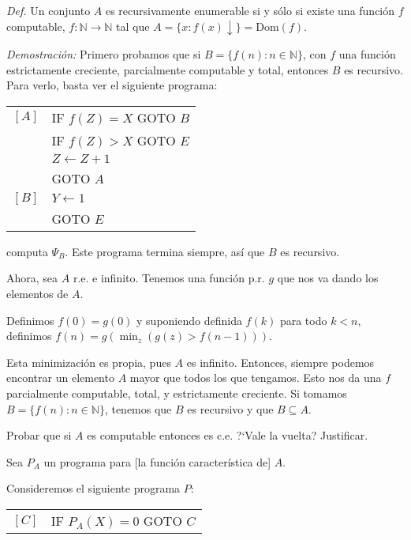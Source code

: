 \begin{questions}
\begin{solution}
 
 {\it Def. } Un conjunto $A$ es recursivamente enumerable si y s\'olo si existe una funci\'on $f$ computable, $f: \mathbb{N} \rightarrow \mathbb{N}$ tal que $A = \{x : f(x)\downarrow \} = \text{Dom}(f)$.
 
 {\it Demostraci\'on: } Primero probamos que si $B = \{ f(n) : n \in \mathbb{N} \}$, con $f$ una funci\'on estrictamente creciente, parcialmente computable y total, entonces $B$ es recursivo. Para verlo, basta ver el siguiente programa: 

 \vspace{0.5cm}
  \begin{tabular}{rl}
    $[A]$ & IF $f(Z)=X$ GOTO $B$ \\
	  & IF $f(Z)>X$ GOTO $E$ \\ 
	  & $Z\leftarrow Z+1$\\
	  & GOTO $A$\\
    $[B]$ & $Y\leftarrow 1$ \\
	  & GOTO $E$
  \end{tabular}
 \vspace{0.5cm}
 
 computa $\Psi_B$. Este programa termina siempre, as\'i que $B$ es recursivo. 
 
 Ahora, sea $A$ r.e. e infinito. Tenemos una funci\'on p.r. $g$ que nos va dando los elementos de $A$. 
 
 Definimos $f(0) = g(0)$ y suponiendo definida $f(k)$ para todo $k<n$, definimos $f(n) = g(\min_z(g(z)>f(n-1)))$.
 
 Esta minimizaci\'on es propia, pues $A$ es infinito. Entonces, siempre podemos encontrar un elemento $A$ mayor que todos los que tengamos. Esto nos da una $f$ parcialmente computable, total, y estrictamente creciente. Si tomamos $B=\{f(n) : n \in \mathbb{N}\}$, tenemos que $B$ es recursivo y que $B\subseteq A$. 
\end{solution}

\question Probar que si $A$ es computable entonces es c.e. ?`Vale la vuelta? Justificar.

\begin{solution}
 Sea $P_A$ un programa para [la funci\'on caracter\'istica de] $A$. 
 
 Consideremos el siguiente programa $P$: 
 
 \vspace{0.5cm}
  \begin{tabular}{rl}
    $[C]$ & IF $P_A(X)=0$ GOTO $C$ \\
  \end{tabular}
 \vspace{0.5cm}
 

\end{solution}
\end{questions}
